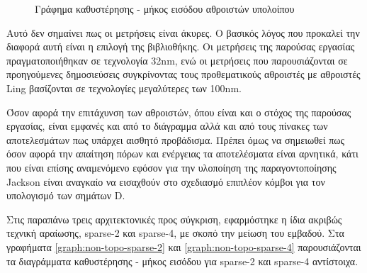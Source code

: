 \begin{figure}[H]
\begin{center}
\end{center}
\caption{Γράφημα καθυστέρησης - μήκος εισόδου αθροιστών υπολοίπου}   
\label{graph:non-topo}
\end{figure}

Αυτό δεν σημαίνει πως οι μετρήσεις είναι άκυρες. Ο βασικός λόγος που προκαλεί την διαφορά αυτή είναι η επιλογή της βιβλιοθήκης. Οι μετρήσεις της παρούσας εργασίας πραγματοποιήθηκαν σε τεχνολογία 32nm, ενώ οι μετρήσεις που παρουσιάζονται σε προηγούμενες δημοσιεύσεις συγκρίνοντας τους προθεματικούς αθροιστές με αθροιστές Ling βασίζονται σε τεχνολογίες μεγαλύτερες των 100nm. 

Όσον αφορά την επιτάχυνση των αθροιστών, όπου είναι και ο στόχος της παρούσας εργασίας, είναι εμφανές και από το διάγραμμα αλλά και από τους πίνακες των αποτελεσμάτων πως υπάρχει αισθητό προβάδισμα. Πρέπει όμως να σημειωθεί πως όσον αφορά την απαίτηση πόρων και ενέργειας τα αποτελέσματα είναι αρνητικά, κάτι που είναι επίσης αναμενόμενο εφόσον για την υλοποίηση της παραγοντοποίησης Jackson είναι αναγκαίο να εισαχθούν στο σχεδιασμό επιπλέον κόμβοι για τον υπολογισμό των σημάτων D.

Στις παραπάνω τρεις αρχιτεκτονικές προς σύγκριση, εφαρμόστηκε η ίδια ακριβώς τεχνική αραίωσης, sparse-2 και sparse-4, με σκοπό την μείωση του εμβαδού. Στα γραφήματα \ref{graph:non-topo-sparse-2} και \ref{graph:non-topo-sparse-4} παρουσιάζονται τα διαγράμματα καθυστέρησης - μήκος εισόδου για sparse-2 και sparse-4 αντίστοιχα.

